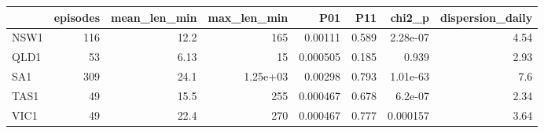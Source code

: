 \begin{tabular}{lrrrrrrr}
\toprule
 & episodes & mean\_len\_min & max\_len\_min & P01 & P11 & chi2\_p & dispersion\_daily \\
\midrule
NSW1 & 116 & 12.2 & 165 & 0.00111 & 0.589 & 2.28e-07 & 4.54 \\
QLD1 & 53 & 6.13 & 15 & 0.000505 & 0.185 & 0.939 & 2.93 \\
SA1 & 309 & 24.1 & 1.25e+03 & 0.00298 & 0.793 & 1.01e-63 & 7.6 \\
TAS1 & 49 & 15.5 & 255 & 0.000467 & 0.678 & 6.2e-07 & 2.34 \\
VIC1 & 49 & 22.4 & 270 & 0.000467 & 0.777 & 0.000157 & 3.64 \\
\bottomrule
\end{tabular}
